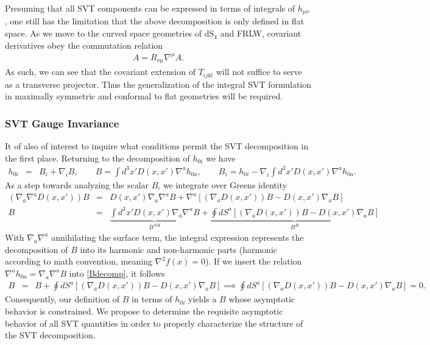 \documentclass[10pt,letterpaper]{article}
\numberwithin{equation}{section}
\begin{document}
\indent Presuming that all SVT components can be expressed in terms of integrals of $h_{\mu\nu}$, one still has the limitation that the above decomposition is only defined in flat space. As we move to the curved space geometries of $\text{dS}_4$ and FRLW, covariant derivatives obey the commutation relation
\begin{eqnarray}
[ \nabla_\mu\nabla^\mu ,\nabla_\nu] A = R_{\nu\mu}\nabla^\mu  A.
\end{eqnarray}
As such, we can see that the covariant extension of $T_{ijkl}$ will not suffice to serve as a transverse projector. Thus the generalization of the integral SVT formulation in maximally symmetric and conformal to flat geometries will be required. 
%
\subsubsection{SVT Gauge Invariance}
\label{sec:SVT Gauge Invariance}
It of also of interest to inquire what conditions permit the SVT decomposition in the first place. Returning to the decomposition of $h_{0i}$ we have
\begin{eqnarray}
h_{0i} &=& B_i + \nabla_i B,\qquad B=\int d^3x' D(x,x')\nabla^a h_{0a},\qquad B_i = h_{0i} - \nabla_i \int d^3x' D(x,x')\nabla^a h_{0a}.
\end{eqnarray}
As a step towards analyzing the scalar $B$, we integrate over Greens identity
\begin{eqnarray}
(\nabla_a\nabla^a D(x,x'))B &=& D(x,x')\nabla_a\nabla^a B + \nabla^a[(\nabla_a D(x,x'))B-D(x,x')\nabla_a B]
\nonumber\\
B &=& \underbrace{\int d^3x' D(x,x')\nabla_a\nabla^a B}_{B^{NH}} + \underbrace{\oint dS^a [(\nabla_a D(x,x'))B-D(x,x')\nabla_a B]}_{B^{H}}
\label{Bdecomp}
\end{eqnarray}
With $\nabla_a\nabla^a$ annihilating the surface term, the integral expression represents the decomposition of $B$ into its harmonic and non-harmonic parts (harmonic according to math convention, meaning $\nabla^2 f(x) =0$). If we insert the relation $\nabla^a h_{0a} = \nabla_a\nabla^a B$ into \eqref{Bdecomp}, it follows
\begin{eqnarray}
B &=& B + \oint dS^a [(\nabla_a D(x,x'))B-D(x,x')\nabla_a B] \implies \oint dS^a [(\nabla_a D(x,x'))B-D(x,x')\nabla_a B] =0.
\end{eqnarray}
Consequently, our definition of $B$ in terms of $h_{0i}$ yields a $B$ whose asymptotic behavior is constrained. We propose to determine the requisite asymptotic behavior of all SVT quantities in order to properly characterize the structure of the SVT decomposition.
\end{document}
